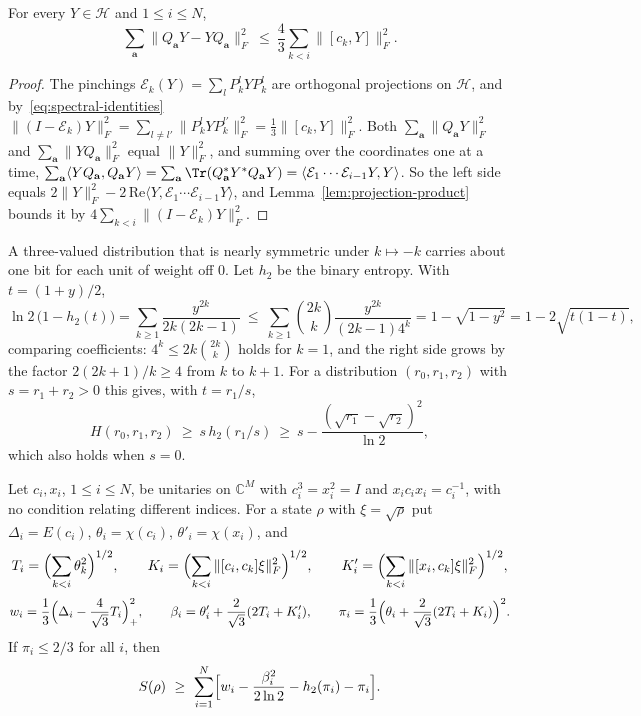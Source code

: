 \begin{lemma}\label{lem:transfer}
For every $Y\in\mathcal H$ and $1\le i\le N$,
\[
\sum_{\mathbf a}\|Q_{\mathbf a}Y-YQ_{\mathbf a}\|_F^2\ \le\ \frac43\sum_{k<i}\|[c_k,Y]\|_F^2 .
\]
\end{lemma}

\begin{proof}
The pinchings $\mathcal E_k(Y)=\sum_lP_k^lYP_k^l$ are orthogonal projections on $\mathcal H$, and by~\eqref{eq:spectral-identities}
$\|(I-\mathcal E_k)Y\|_F^2=\sum_{l\ne l'}\|P_k^lYP_k^{l'}\|_F^2=\frac13\|[c_k,Y]\|_F^2$. Both $\sum_{\mathbf a}\|Q_{\mathbf a}Y\|_F^2$ and
$\sum_{\mathbf a}\|YQ_{\mathbf a}\|_F^2$ equal $\|Y\|_F^2$, and summing over the coordinates one at a time,
$\sum_{\mathbf a}\langle YQ_{\mathbf a},Q_{\mathbf a}Y\rangle=\sum_{\mathbf a}\Tr(Q_{\mathbf a}^*Y^*Q_{\mathbf a}Y)=\langle\mathcal E_1\cdots\mathcal E_{i-1}Y,Y\rangle$.
So the left side equals $2\|Y\|_F^2-2\,\mathrm{Re}\langle Y,\mathcal E_1\cdots\mathcal E_{i-1}Y\rangle$, and Lemma~\ref{lem:projection-product} bounds it by
$4\sum_{k<i}\|(I-\mathcal E_k)Y\|_F^2$.
\end{proof}

A three-valued distribution that is nearly symmetric under $k\mapsto-k$ carries about one bit for each unit of weight off $0$. Let $h_2$ be the
binary entropy. With $t=(1+y)/2$,
\[
\ln2\,\bigl(1-h_2(t)\bigr)=\sum_{k\ge1}\frac{y^{2k}}{2k(2k-1)}\ \le\ \sum_{k\ge1}\binom{2k}k\frac{y^{2k}}{(2k-1)4^k}=1-\sqrt{1-y^2}=1-2\sqrt{t(1-t)},
\]
comparing coefficients: $4^k\le2k\binom{2k}k$ holds for $k=1$, and the right side grows by the factor $2(2k+1)/k\ge4$ from $k$ to $k+1$. For a
distribution $(r_0,r_1,r_2)$ with $s=r_1+r_2>0$ this gives, with $t=r_1/s$,
\begin{equation}\label{eq:binary-hellinger}
H(r_0,r_1,r_2)\ \ge\ s\,h_2(r_1/s)\ \ge\ s-\frac{(\sqrt{r_1}-\sqrt{r_2})^2}{\ln2},
\end{equation}
which also holds when $s=0$.

\begin{theorem}\label{thm:sector}
Let $c_i,x_i$, $1\le i\le N$, be unitaries on $\mathbb C^M$ with $c_i^3=x_i^2=I$ and $x_ic_ix_i=c_i^{-1}$, with no condition relating different
indices. For a state $\rho$ with $\xi=\sqrt\rho$ put $\Delta_i=E(c_i)$, $\theta_i=\chi(c_i)$, $\theta'_i=\chi(x_i)$, and
\[
T_i=\Bigl(\sum_{k<i}\theta_k^2\Bigr)^{1/2},\qquad K_i=\Bigl(\sum_{k<i}\|[c_i,c_k]\xi\|_F^2\Bigr)^{1/2},\qquad K'_i=\Bigl(\sum_{k<i}\|[x_i,c_k]\xi\|_F^2\Bigr)^{1/2},
\]
\[
w_i=\frac13\Bigl(\Delta_i-\frac4{\sqrt3}T_i\Bigr)_+^2,\qquad\beta_i=\theta'_i+\frac2{\sqrt3}(2T_i+K'_i),\qquad
\pi_i=\frac13\Bigl(\theta_i+\frac2{\sqrt3}(2T_i+K_i)\Bigr)^2 .
\]
If $\pi_i\le2/3$ for all $i$, then
\[
S(\rho)\ \ge\ \sum_{i=1}^N\Bigl[w_i-\frac{\beta_i^2}{2\ln2}-h_2(\pi_i)-\pi_i\Bigr].
\]
\end{theorem}

